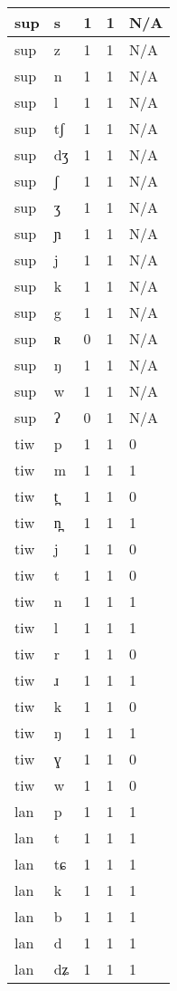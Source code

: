 \begin{longtable}{ | l | l | l | l | l | }
	sup & s & 1 & 1 & N/A \\ \hline
	sup & z & 1 & 1 & N/A \\ \hline
	sup & n & 1 & 1 & N/A \\ \hline
	sup & l & 1 & 1 & N/A \\ \hline
	sup & tʃ & 1 & 1 & N/A \\ \hline
	sup & dʒ & 1 & 1 & N/A \\ \hline
	sup & ʃ & 1 & 1 & N/A \\ \hline
	sup & ʒ & 1 & 1 & N/A \\ \hline
	sup & ɲ & 1 & 1 & N/A \\ \hline
	sup & j & 1 & 1 & N/A \\ \hline
	sup & k & 1 & 1 & N/A \\ \hline
	sup & g & 1 & 1 & N/A \\ \hline
	sup & ʀ & 0 & 1 & N/A \\ \hline
	sup & ŋ & 1 & 1 & N/A \\ \hline
	sup & w & 1 & 1 & N/A \\ \hline
	sup & ʔ & 0 & 1 & N/A \\ \hline
	tiw & p & 1 & 1 & 0 \\ \hline
	tiw & m & 1 & 1 & 1 \\ \hline
	tiw & t̪ & 1 & 1 & 0 \\ \hline
	tiw & n̪ & 1 & 1 & 1 \\ \hline
	tiw & j & 1 & 1 & 0 \\ \hline
	tiw & t & 1 & 1 & 0 \\ \hline
	tiw & n & 1 & 1 & 1 \\ \hline
	tiw & l & 1 & 1 & 1 \\ \hline
	tiw & r & 1 & 1 & 0 \\ \hline
	tiw & ɹ & 1 & 1 & 1 \\ \hline
	tiw & k & 1 & 1 & 0 \\ \hline
	tiw & ŋ & 1 & 1 & 1 \\ \hline
	tiw & ɣ & 1 & 1 & 0 \\ \hline
	tiw & w & 1 & 1 & 0 \\ \hline
	lan & p & 1 & 1 & 1 \\ \hline
	lan & t & 1 & 1 & 1 \\ \hline
	lan & tɕ & 1 & 1 & 1 \\ \hline
	lan & k & 1 & 1 & 1 \\ \hline
	lan & b & 1 & 1 & 1 \\ \hline
	lan & d & 1 & 1 & 1 \\ \hline
	lan & dʑ & 1 & 1 & 1 \\ \hline

\end{longtable}
